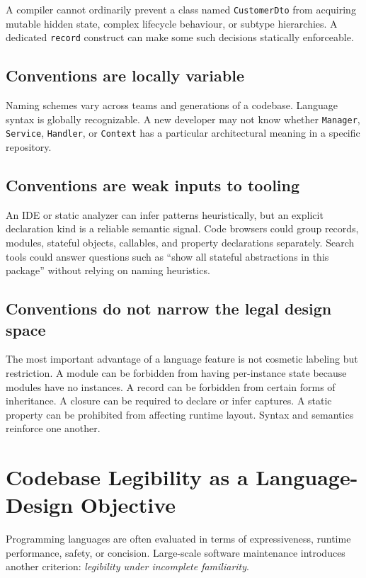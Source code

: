 \documentclass[11pt]{article}
\begin{document}
A compiler cannot ordinarily prevent a class named \texttt{CustomerDto} from acquiring mutable hidden state, complex lifecycle behaviour, or subtype hierarchies. A dedicated \texttt{record} construct can make some such decisions statically enforceable.

\subsection{Conventions are locally variable}

Naming schemes vary across teams and generations of a codebase. Language syntax is globally recognizable. A new developer may not know whether \texttt{Manager}, \texttt{Service}, \texttt{Handler}, or \texttt{Context} has a particular architectural meaning in a specific repository.

\subsection{Conventions are weak inputs to tooling}

An IDE or static analyzer can infer patterns heuristically, but an explicit declaration kind is a reliable semantic signal. Code browsers could group records, modules, stateful objects, callables, and property declarations separately. Search tools could answer questions such as ``show all stateful abstractions in this package'' without relying on naming heuristics.

\subsection{Conventions do not narrow the legal design space}

The most important advantage of a language feature is not cosmetic labeling but restriction. A module can be forbidden from having per-instance state because modules have no instances. A record can be forbidden from certain forms of inheritance. A closure can be required to declare or infer captures. A static property can be prohibited from affecting runtime layout. Syntax and semantics reinforce one another.

\section{Codebase Legibility as a Language-Design Objective}

Programming languages are often evaluated in terms of expressiveness, runtime performance, safety, or concision. Large-scale software maintenance introduces another criterion: \emph{legibility under incomplete familiarity}.
\end{document}
